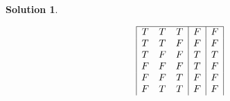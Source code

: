\documentclass[10pt]{article}
\theoremstyle{definition}
\newtheorem{soln}{Solution}
\begin{document}
\begin{soln}
\begin{enumerate}[label=(\alph*)]
\begin{displaymath}
\begin{array}{|c c c|c|c|}
              \hline %
              T & T & T & F                           & F                                 \\
              T & T & F & F                           & F                                 \\
              T & F & F & T                           & T                                 \\
              F & F & F & T                           & F                                 \\
              F & F & T & F                           & F                                 \\
              F & T & T & F                           & F
            \end{array}
          \end{displaymath}
  \end{enumerate}
\end{soln}
\newpage
\end{document}
